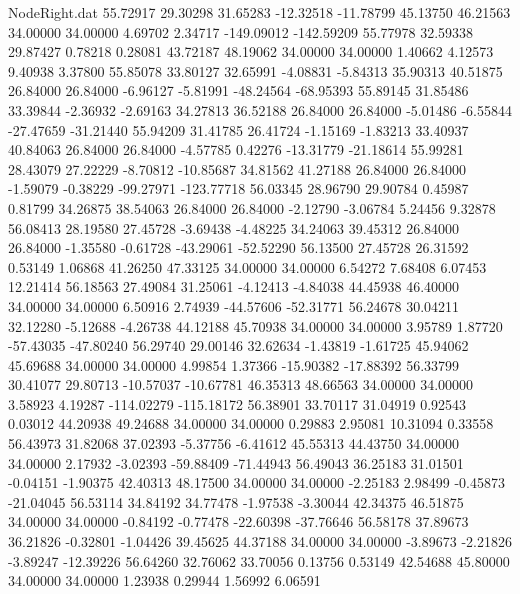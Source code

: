 \begin{filecontents}{NodeRight.dat}
  55.72917   29.30298   31.65283   -12.32518  -11.78799   45.13750   46.21563   34.00000   34.00000    4.69702    2.34717 -149.09012 -142.59209
  55.77978   32.59338   29.87427     0.78218    0.28081   43.72187   48.19062   34.00000   34.00000    1.40662    4.12573    9.40938    3.37800
  55.85078   33.80127   32.65991    -4.08831   -5.84313   35.90313   40.51875   26.84000   26.84000   -6.96127   -5.81991  -48.24564  -68.95393
  55.89145   31.85486   33.39844    -2.36932   -2.69163   34.27813   36.52188   26.84000   26.84000   -5.01486   -6.55844  -27.47659  -31.21440
  55.94209   31.41785   26.41724    -1.15169   -1.83213   33.40937   40.84063   26.84000   26.84000   -4.57785    0.42276  -13.31779  -21.18614
  55.99281   28.43079   27.22229    -8.70812  -10.85687   34.81562   41.27188   26.84000   26.84000   -1.59079   -0.38229  -99.27971 -123.77718
  56.03345   28.96790   29.90784     0.45987    0.81799   34.26875   38.54063   26.84000   26.84000   -2.12790   -3.06784    5.24456    9.32878
  56.08413   28.19580   27.45728    -3.69438   -4.48225   34.24063   39.45312   26.84000   26.84000   -1.35580   -0.61728  -43.29061  -52.52290
  56.13500   27.45728   26.31592     0.53149    1.06868   41.26250   47.33125   34.00000   34.00000    6.54272    7.68408    6.07453   12.21414
  56.18563   27.49084   31.25061    -4.12413   -4.84038   44.45938   46.40000   34.00000   34.00000    6.50916    2.74939  -44.57606  -52.31771
  56.24678   30.04211   32.12280    -5.12688   -4.26738   44.12188   45.70938   34.00000   34.00000    3.95789    1.87720  -57.43035  -47.80240
  56.29740   29.00146   32.62634    -1.43819   -1.61725   45.94062   45.69688   34.00000   34.00000    4.99854    1.37366  -15.90382  -17.88392
  56.33799   30.41077   29.80713   -10.57037  -10.67781   46.35313   48.66563   34.00000   34.00000    3.58923    4.19287 -114.02279 -115.18172
  56.38901   33.70117   31.04919     0.92543    0.03012   44.20938   49.24688   34.00000   34.00000    0.29883    2.95081   10.31094    0.33558
  56.43973   31.82068   37.02393    -5.37756   -6.41612   45.55313   44.43750   34.00000   34.00000    2.17932   -3.02393  -59.88409  -71.44943
  56.49043   36.25183   31.01501    -0.04151   -1.90375   42.40313   48.17500   34.00000   34.00000   -2.25183    2.98499   -0.45873  -21.04045
  56.53114   34.84192   34.77478    -1.97538   -3.30044   42.34375   46.51875   34.00000   34.00000   -0.84192   -0.77478  -22.60398  -37.76646
  56.58178   37.89673   36.21826    -0.32801   -1.04426   39.45625   44.37188   34.00000   34.00000   -3.89673   -2.21826   -3.89247  -12.39226
  56.64260   32.76062   33.70056     0.13756    0.53149   42.54688   45.80000   34.00000   34.00000    1.23938    0.29944    1.56992    6.06591

\end{filecontents}

